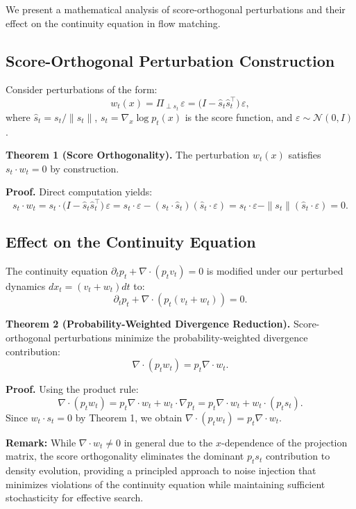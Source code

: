 \documentclass{article} %
\begin{document}
We present a mathematical analysis of score-orthogonal perturbations and their effect on the continuity equation in flow matching.

\subsection{Score-Orthogonal Perturbation Construction}

Consider perturbations of the form:
\[
w_t(x) = \Pi_{\perp s_t}\,\varepsilon = \bigl(I - \hat s_t \hat s_t^\top\bigr)\,\varepsilon,
\]
where \(\hat s_t = s_t/\|s_t\|\), \(s_t = \nabla_x \log p_t(x)\) is the score function, and \(\varepsilon \sim \mathcal{N}(0,I)\).

\textbf{Theorem 1 (Score Orthogonality).} The perturbation \(w_t(x)\) satisfies \(s_t \cdot w_t = 0\) by construction.

\textbf{Proof.} Direct computation yields:
\[
s_t \cdot w_t = s_t \cdot \bigl(I - \hat s_t \hat s_t^\top\bigr)\,\varepsilon = s_t \cdot \varepsilon - (s_t \cdot \hat s_t)(\hat s_t \cdot \varepsilon) = s_t \cdot \varepsilon - \|s_t\|(\hat s_t \cdot \varepsilon) = 0.
\]

\subsection{Effect on the Continuity Equation}

The continuity equation \(\partial_t p_t + \nabla \cdot (p_t v_t) = 0\) is modified under our perturbed dynamics \(dx_t = (v_t + w_t)dt\) to:
\[
\partial_t p_t + \nabla \cdot (p_t (v_t + w_t)) = 0.
\]

\textbf{Theorem 2 (Probability-Weighted Divergence Reduction).} Score-orthogonal perturbations minimize the probability-weighted divergence contribution:
\[
\nabla \cdot (p_t w_t) = p_t \nabla \cdot w_t.
\]

\textbf{Proof.} Using the product rule:
\[
\nabla \cdot (p_t w_t) = p_t \nabla \cdot w_t + w_t \cdot \nabla p_t = p_t \nabla \cdot w_t + w_t \cdot (p_t s_t).
\]
Since \(w_t \cdot s_t = 0\) by Theorem 1, we obtain \(\nabla \cdot (p_t w_t) = p_t \nabla \cdot w_t\).

\textbf{Remark:} While \(\nabla \cdot w_t \neq 0\) in general due to the \(x\)-dependence of the projection matrix, the score orthogonality eliminates the dominant \(p_t s_t\) contribution to density evolution, providing a principled approach to noise injection that minimizes violations of the continuity equation while maintaining sufficient stochasticity for effective search.
\end{document}
